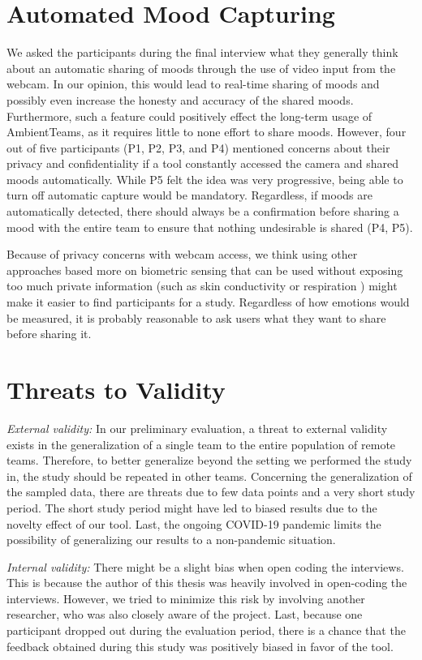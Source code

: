 \section{Automated Mood Capturing}
We asked the participants during the final interview what they generally think about an automatic sharing of moods through the use of video input from the webcam. In our opinion, this would lead to real-time sharing of moods and possibly even increase the honesty and accuracy of the shared moods. Furthermore, such a feature could positively effect the long-term usage of AmbientTeams, as it requires little to none effort to share moods. However, four out of five participants (P1, P2, P3, and P4) mentioned concerns about their privacy and confidentiality if a tool constantly accessed the camera and shared moods automatically. While P5 felt the idea was very progressive, being able to turn off automatic capture would be mandatory. Regardless, if moods are automatically detected, there should always be a confirmation before sharing a mood with the entire team to ensure that nothing undesirable is shared (P4, P5).

Because of privacy concerns with webcam access, we think using other approaches based more on biometric sensing that can be used without exposing too much private information (such as skin conductivity or respiration \autocite{picard2001toward}) might make it easier to find participants for a study. Regardless of how emotions would be measured, it is probably reasonable to ask users what they want to share before sharing it.

\section{Threats to Validity}
\textit{External validity:} In our preliminary evaluation, a threat to external validity exists in the generalization of a single team to the entire population of remote teams. Therefore, to better generalize beyond the setting we performed the study in, the study should be repeated in other teams. Concerning the generalization of the sampled data, there are threats due to few data points and a very short study period. The short study period might have led to biased results due to the novelty effect of our tool. Last, the ongoing COVID-19 pandemic limits the possibility of generalizing our results to a non-pandemic situation.

\medskip\noindent\textit{Internal validity:} There might be a slight bias when open coding the interviews. This is because the author of this thesis was heavily involved in open-coding the interviews. However, we tried to minimize this risk by involving another researcher, who was also closely aware of the project. Last, because one participant dropped out during the evaluation period, there is a chance that the feedback obtained during this study was positively biased in favor of the tool. 